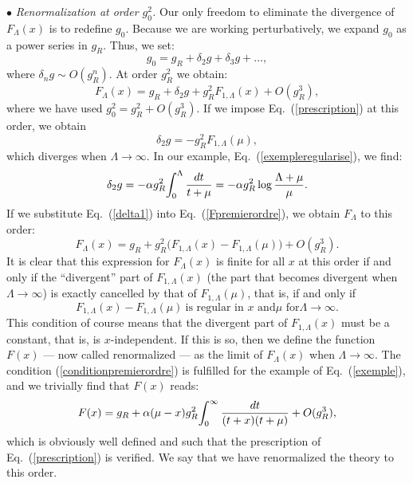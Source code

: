 \documentclass[floatfix,preprintnumbers,amsmath,amssymb,prb,12pt]{revtex4-1}
\begin{document}
$\bullet$ {\it Renormalization at order $g_0^2$.} Our only freedom to eliminate the divergence of $F_\Lambda(x)$ is to redefine $g_0$. Because
we are working perturbatively, we expand $g_0$ as a power series
in $g_R$. Thus, we set:
\begin{equation}
g_0=g_R + \delta_2 g
+ \delta_3 g + \dots,
\end{equation}
where $\delta_n g \sim O(g_R^{n})$. At
order $g_R^2$ we obtain:
\begin{equation}
F_\Lambda(x)= g_R+ \delta_2 g +g_R^2 
F_{1,\Lambda}(x) + O(g_R^3),
\label{Fpremierordre}
\end{equation}
where we have used $g_0^2=g_R^2 +O(g_R^3)$. If we impose
Eq.~(\ref{prescription}) at this order, we obtain
\begin{equation}
\delta_2 g= - g_R^2 
F_{1,\Lambda}(\mu),
\label{delta1}
\end{equation}
which diverges when $\Lambda\to \infty$. In our example,
Eq.~(\ref{exempleregularise}), we find:
\begin{equation}
\delta_2 g= - \alpha g_R^2
\! \int_0^\Lambda {dt\over t+\mu}= -\alpha g_R^2 \log{\Lambda
+\mu\over\mu}.
\end{equation}
If we substitute Eq.~(\ref{delta1}) into Eq.~(\ref{Fpremierordre}),
we obtain $F_\Lambda$ to this order:
\begin{equation} 
F_\Lambda(x)= g_R + g_R^2 \big(F_{1,\Lambda}(x) -
F_{1,\Lambda}(\mu)\big) + O(g_R^3).
\label{Frenormalise2}
\end{equation}
It is clear that this expression for $F_\Lambda(x)$ is finite for
all
$x$ at this order if and only if the ``divergent'' part of
$F_{1,\Lambda}(x)$ (the part that becomes divergent when
$\Lambda\to\infty$) is exactly cancelled by that of
$F_{1,\Lambda}(\mu)$, that is, if and only if
\begin{equation}
F_{1,\Lambda}(x)-F_{1,\Lambda}(\mu)\ \mbox{is regular in $x$ and
$\mu$ for
$\Lambda\to\infty$.}
\label{conditionpremierordre}
\end{equation}
This condition of course means
that the divergent part of $F_{1,\Lambda}(x)$ must be a constant,
that is, is $x$-independent. If this is so, then we define the
function $F(x)$ --- now called renormalized --- as the limit of
$F_\Lambda(x)$ when
$\Lambda\to\infty$. The condition (\ref{conditionpremierordre}) is 
fulfilled for the
example of Eq.~(\ref{exemple}), and we trivially find that $F(x)$
reads:
\begin{equation}
F(x)= g_R +\alpha (\mu-x) g_R^2 \! \int_0^\infty {dt\over
(t+x)(t+\mu)} +O(g_R^3),
\end{equation}
which is obviously well defined and such that the prescription of
Eq.~(\ref{prescription}) is verified. We say that we have
renormalized the theory to this order.
\end{document}
